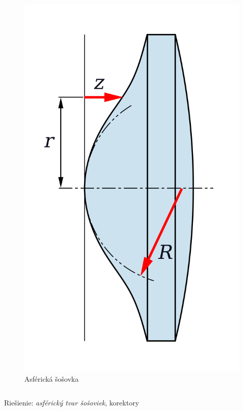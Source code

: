 \documentclass[10pt,xcolor=pdflatex]{beamer}
\begin{document}
\begin{frame}
\begin{columns}
\begin{figure}
        \includegraphics[scale=0.05]{img/asphericLen.png}
        \caption{Asférická šošovka}
    \end{figure}
    \end{columns}
        Riešienie: \textit{asférický tvar šošoviek}, korektory
\end{frame}
\end{document}
